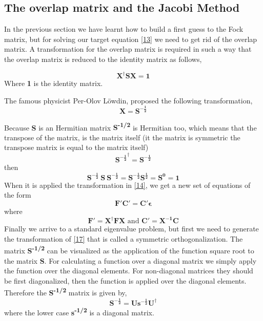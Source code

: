\documentclass{tmr}
\begin{document}
\subsection{The overlap matrix and the Jacobi Method}

In the previous section we have learnt how to build a first guess to the Fock matrix,
but for solving our target equation \eqref{13} we need to get rid of the overlap matrix.
A transformation for the overlap matrix is required in such a way that the overlap matrix
is reduced to the identity matrix as follows,

\begin{equation}\label{17}
 \mathbf{X^{\dagger}SX} = \mathbf{1}
\end{equation}
Where \textbf{1} is the identity matrix. 

\par The famous physicist Per-Olov L\"owdin, proposed the following transformation,
\begin{equation}\label{18}
\mathbf{X} = \mathbf{S^{-\frac{1}{2}}} 
\end{equation}

Because \textbf{S} is an Hermitian matrix  \textbf{S\textsuperscript{-1/2}} is Hermitian too,
which means that the transpose of the matrix, is the matrix itself (it the matrix is
symmetric the transpose matrix is equal to the matrix itself)
\[ \mathbf{{S^{-\frac{1}{2}}}^{\dagger}} = \mathbf{S^{-\frac{1}{2}}} \]
then
\[ \mathbf{S^{-\frac{1}{2}}\ S\ S^{-\frac{1}{2}}} =  \mathbf{S^{-\frac{1}{2}} S^{\frac{1}{2}}}
= \mathbf{S^0} = \mathbf{1}
\]
When it is applied the transformation in \eqref{14},
we get a new set of equations of the form
\begin{equation}\label{19}
\mathbf{F'C'} = \mathbf{C'\epsilon} 
\end{equation}
where 
\begin{equation}\label{20}
\mathbf{F'} = \mathbf{X^{\dagger}FX} \text{ and }  \mathbf{C'} = \mathbf{X^{-1}C}
\end{equation}
Finally we arrive to a standard eigenvalue problem, but first we need to generate
the transformation of \eqref{17} that is called a symmetric orthogonalization. The
matrix \textbf{S\textsuperscript{-1/2}} can be visualized as the application of the 
function square root to the matrix \textbf{S}. For calculating a
function over a diagonal matrix we simply apply the function
over the diagonal elements. For non-diagonal matrices they should be first diagonalized, then
the function is applied over the diagonal elements. Therefore the \textbf{S\textsuperscript{-1/2}}
matrix is given by,
\begin{equation}\label{21}
\mathbf{S^{-\frac{1}{2}}} = \mathbf{U{s^{-\frac{1}{2}}}U^{\dagger}}
\end{equation}
where the lower case \textbf{s\textsuperscript{-1/2}} is a diagonal matrix. 
\end{document}
